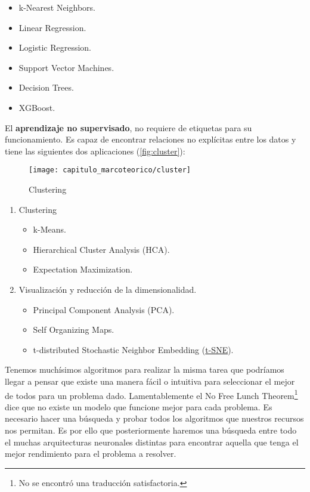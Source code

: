 \begin{itemize}
    \item k-Nearest Neighbors.
    \item Linear Regression.
    \item Logistic Regression.
    \item Support Vector Machines.
    \item Decision Trees.
    \item XGBoost.
\end{itemize} 

El \textbf{aprendizaje no supervisado}, no requiere de etiquetas para su
funcionamiento. Es capaz de encontrar relaciones no explícitas entre los datos y
tiene las siguientes dos aplicaciones (\autoref{fig:cluster}):

\begin{figure}[H]
    \centering
    \texttt{[image: capitulo\_marcoteorico/cluster]}
    \caption{Clustering}\label{fig:cluster}
\end{figure}

\begin{enumerate}
    \item Clustering
    \begin{itemize}
        \item k-Means.
        \item Hierarchical Cluster Analysis (HCA).
        \item Expectation Maximization.
    \end{itemize}
    \item Visualización y reducción de la dimensionalidad.
    \begin{itemize}
        \item Principal Component Analysis (PCA).
        \item Self Organizing Maps.
        \item t-distributed Stochastic Neighbor Embedding (\hyperlink{abbr}{t-SNE}).
    \end{itemize}
\end{enumerate}

Tenemos muchísimos algoritmos para realizar la misma tarea que podríamos llegar
a pensar que existe una manera fácil o intuitiva para seleccionar el mejor de
todos para un problema dado. Lamentablemente el No Free Lunch
Theorem\footnote{No se encontró una traducción satisfactoria.} dice que no
existe un modelo que funcione mejor para cada problema. Es necesario hacer una
búsqueda y probar todos los algoritmos que nuestros recursos nos permitan. Es
por ello que posteriormente haremos una búsqueda entre todo el muchas
arquitecturas neuronales distintas para encontrar aquella que tenga el mejor
rendimiento para el problema a resolver. 

